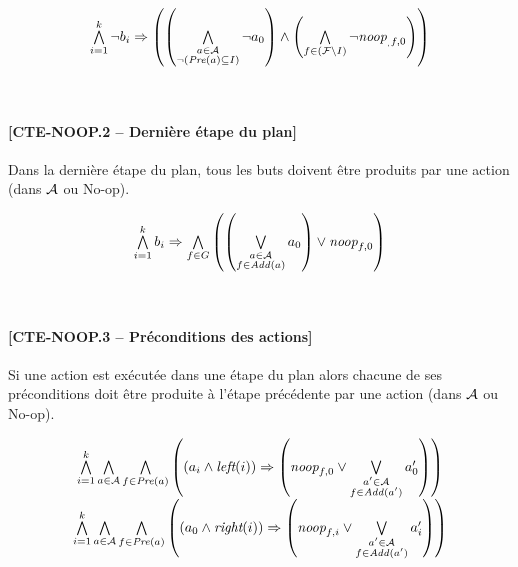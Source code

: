 \begin{small}
\[
\begin{matrix}
\bigwedge\limits_{\substack{i=1}}^{k} \neg b_{i} \Rightarrow \left( \left(\bigwedge\limits_{\substack{\substack{a \in \mathcal{A}\\\neg \left(\mathit{Pre}(a)\subseteq I\right)}}} \neg a_{0} \right)
\wedge \left(\bigwedge\limits_{\substack{f\in \left(\mathcal{F}\setminus I\right)}}\neg \textit{noop}_{_,f,0}\right)\right)\\
\end{matrix}
\]
\end{small}\\

\paragraph*{[CTE-NOOP.2 -- Dernière étape du plan]}

Dans la dernière étape du plan, tous les buts doivent être produits par une action (dans $\mathcal{A}$ ou No-op).

\begin{small}
\[
\begin{matrix}
\bigwedge\limits_{\substack{i=1}}^{k} b_{i} \Rightarrow \bigwedge\limits_{\substack{f\in G}}\left(\left(\bigvee\limits_{\substack{\substack{a\in\mathcal{A}\\ f \in \mathit{Add}(a)}}} a_{0}\right) \vee \textit{noop}_{f,0}\right)
\end{matrix}
\]
\end{small}\\

\paragraph*{[CTE-NOOP.3 -- Préconditions des actions]}

Si une action est exécutée dans une étape du plan alors chacune de ses préconditions doit être produite à l'étape précédente par une action (dans $\mathcal{A}$ ou No-op).

\begin{small}
\[
\begin{matrix}
\bigwedge\limits_{\substack{i=1}}^{k} \bigwedge\limits_{\substack{a\in\mathcal{A}}} \bigwedge\limits_{\substack{f\in \mathit{Pre}(a)}} \left(\left(a_{i} \wedge \textit{left}(i) \right) \Rightarrow \left(\textit{noop}_{f,0} \vee \bigvee\limits_{\substack{a' \in \mathcal{A} \\ f \in \mathit{Add}(a')}} a'_{0}\right)\right)\\
\bigwedge\limits_{\substack{i=1}}^{k} \bigwedge\limits_{\substack{a\in\mathcal{A}}} \bigwedge\limits_{\substack{f\in \mathit{Pre}(a)}}\left(\left(a_{0} \wedge \textit{right}(i) \right) \Rightarrow \left(\textit{noop}_{f,i} \vee \bigvee\limits_{\substack{a' \in \mathcal{A} \\ f \in \mathit{Add}(a')}} a'_{i}\right)\right)
\end{matrix}
\]
\end{small}\\

